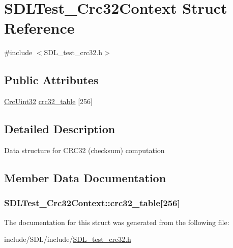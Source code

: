 \hypertarget{struct_s_d_l_test___crc32_context}{\section{S\-D\-L\-Test\-\_\-\-Crc32\-Context Struct Reference}
\label{struct_s_d_l_test___crc32_context}
}


{\ttfamily \#include $<$S\-D\-L\-\_\-test\-\_\-crc32.\-h$>$}

\subsection*{Public Attributes}
\begin{DoxyCompactItemize}
\item 
\hyperlink{_s_d_l__test__crc32_8h_ac0e8fe38fa91e9aa4b32957420795387}{Crc\-Uint32} \hyperlink{struct_s_d_l_test___crc32_context_ae95d0d0b48bafc4e2f6f032f754ffa4c}{crc32\-\_\-table} \mbox{[}256\mbox{]}
\end{DoxyCompactItemize}


\subsection{Detailed Description}
Data structure for C\-R\-C32 (checksum) computation 

\subsection{Member Data Documentation}
\hypertarget{struct_s_d_l_test___crc32_context_ae95d0d0b48bafc4e2f6f032f754ffa4c}{
\subsubsection[{crc32\-\_\-table}]{ S\-D\-L\-Test\-\_\-\-Crc32\-Context\-::crc32\-\_\-table\mbox{[}256\mbox{]}}}\label{struct_s_d_l_test___crc32_context_ae95d0d0b48bafc4e2f6f032f754ffa4c}


The documentation for this struct was generated from the following file\-:\begin{DoxyCompactItemize}
\item 
include/\-S\-D\-L/include/\hyperlink{_s_d_l__test__crc32_8h}{S\-D\-L\-\_\-test\-\_\-crc32.\-h}\end{DoxyCompactItemize}
